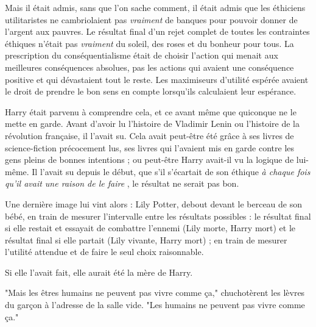 Mais il était admis, sans que l'on sache comment, il était admis que les éthiciens utilitaristes ne cambriolaient pas \emph{vraiment}  de banques pour pouvoir donner de l'argent aux pauvres. Le résultat final d'un rejet complet de toutes les contraintes éthiques n'était pas \emph{vraiment}  du soleil, des roses et du bonheur pour tous. La prescription du conséquentialisme était de choisir l'action qui menait aux meilleures conséquences absolues, pas les actions qui avaient une conséquence positive et qui dévastaient tout le reste. Les maximiseurs d'utilité espérée avaient le droit de prendre le bon sens en compte lorsqu'ils calculaient leur espérance.

Harry était parvenu à comprendre cela, et ce avant même que quiconque ne le mette en garde. Avant d'avoir lu l'histoire de Vladimir Lenin ou l'histoire de la révolution française, il l'avait su. Cela avait peut-être été grâce à ses livres de science-fiction précocement lus, ses livres qui l'avaient mis en garde contre les gens pleins de bonnes intentions ; ou peut-être Harry avait-il vu la logique de lui-même. Il l'avait su depuis le début, que s'il s'écartait de son éthique \emph{à chaque fois qu'il avait une raison de le faire} , le résultat ne serait pas bon.

Une dernière image lui vint alors : Lily Potter, debout devant le berceau de son bébé, en train de mesurer l'intervalle entre les résultats possibles : le résultat final si elle restait et essayait de combattre l'ennemi (Lily morte, Harry mort) et le résultat final si elle partait (Lily vivante, Harry mort) ; en train de mesurer l'utilité attendue et de faire le seul choix raisonnable.

Si elle l'avait fait, elle aurait été la mère de Harry.

"Mais les êtres humains ne peuvent pas vivre comme ça," chuchotèrent les lèvres du garçon à l'adresse de la salle vide. "Les humains ne peuvent pas vivre comme ça."

